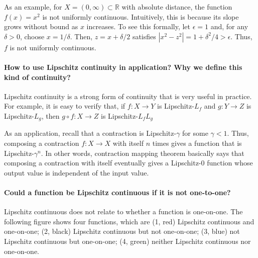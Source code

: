 \documentclass[10pt,english]{article}
\begin{document}
As an example, for $X=(0,\infty)\subset \mathbb{R}$ with absolute distance, the function $f(x)=x^2$ is not uniformly continuous.
Intuitively, this is because its slope grows without bound as $x$ increases.
To see this formally, let $\epsilon = 1$ and, for any $\delta >0$, choose $x=1/\delta$.
Then, $z=x+\delta/2$ satisfies $|x^2 - z^2| = 1+\delta^2 / 4 > \epsilon$.
Thus, $f$ is not uniformly continuous.


\paragraph{How to use Lipschitz continuity in application? Why we define this kind of continuity?} %

Lipschitz continuity is a strong form of continuity that is very useful in practice.
For example, it is easy to verify that, if $f\colon X \to Y$ is Lipschitz-$L_f$ and $g \colon Y \to Z$ is Lipschitz-$L_g$, then $g \circ f \colon X \to Z$ is Lipschitz-$L_f L_g$

As an application, recall that a contraction is Lipschitz-$\gamma$ for some $\gamma <1$.
Thus, composing a contraction $f \colon X \to X$ with itself $n$ times gives a function that is Lipschitz-$\gamma^n$.
In other words, contraction mapping theorem basically says that composing a contraction with itself eventually gives a Lipschitz-0 function whose output value is independent of the input value.

 
\paragraph{Could a function be Lipschitz continuous if it is not one-to-one?}

Lipschitz continuous does not relate to whether a function is one-on-one. The following figure shows four functions, which are (1, red) Lipschitz continuous and one-on-one; (2, black) Lipschitz continuous but not one-on-one; (3, blue) not Lipschitz continuous but one-on-one; (4, green) neither Lipschitz continuous nor one-on-one.
\end{document}
